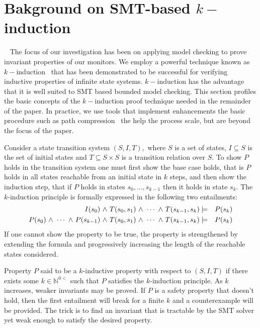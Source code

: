 \section{Bakground on SMT-based $k-$induction}~\label{sec:background} 
The focus of our  investigation has  been on applying model checking to  prove
invariant properties of our monitors.   We  
employ a powerful technique known as $k-$induction~\cite{Sheeran00,
  EenS03} that has been demonstrated to be successful for verifying inductive
properties of infinite state systems.   $k-$induction  has the
advantage that it is well suited  to  SMT 
based bounded model checking. This section profiles the
basic concepts of the  $k-$induction proof technique needed in the
remainder of the paper. In practice, we
use tools that implement  enhancements the basic procedure such as path
compression~\cite{dMRS03} the help the process scale, but are beyond
the focus of the paper. 

Consider  a state transition system  $(S,I,T),$
where $S$ is a set of states, $I \subseteq S$ is the set of initial
states and $T \subseteq S \times S $ is a transition relation over
$S.$ To show $P$ holds in the transition system one must first
show the base case holds, that is $P$ holds in all states reachable
from an initial state in $k$ steps, and then show the induction step,
that if $P$ holds in states $s_0,\ldots,s_{k-1}$ then it holds in
state $s_k.$ The $k$-induction principle is formally expressed in the
following two entailments:
\begin{eqnarray*}
I(s_0) {\ \wedge \ } T(s_0,s_1) {\ \wedge \ } \cdots {\ \wedge \ } T(s_{k-1},s_k) &\models&
P(s_k) \\
P(s_0) {\ \wedge \ } \cdots {\ \wedge \ } P(s_{k-1}) {\ \wedge \ } T(s_0,s_1) {\ \wedge \ } \cdots {\ \wedge \ } T(s_{k-1},s_k) &\models&
P(s_k) 
\end{eqnarray*} 
If one cannot show the property to be true, the
property is strengthened by extending the formula and
progressively increasing the length of the reachable states
considered.  

Property $P$ said to be a $k$-inductive property with respect to
$(S,I,T)$ if there exists some $k \in \mathbb{N}^{0<}$ such that $P$
satisfies the $k$-induction principle. As $k$ increases, weaker
invariants may be proved. If $P$ is a safety property that doesn't hold, then the first entailment will break for a finite $k$ and a counterexample will be provided. The trick is to find an invariant that is
tractable by the SMT solver yet weak enough to satisfy the desired
property.  